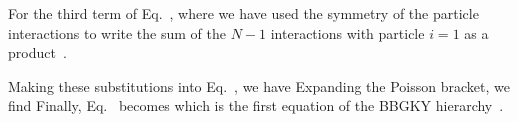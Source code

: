 {	For the third term of Eq.~,
	where we have used the symmetry of the particle interactions to write the sum of the $N - 1$ interactions with particle $i = 1$ as a product~\cite[p.~64]{Kardar}.
	
	Making these substitutions into Eq.~, we have
	Expanding the Poisson bracket, we find
	Finally, Eq.~ becomes
	which is the first equation of the BBGKY hierarchy~\cite[p.~65]{Kardar}.
}